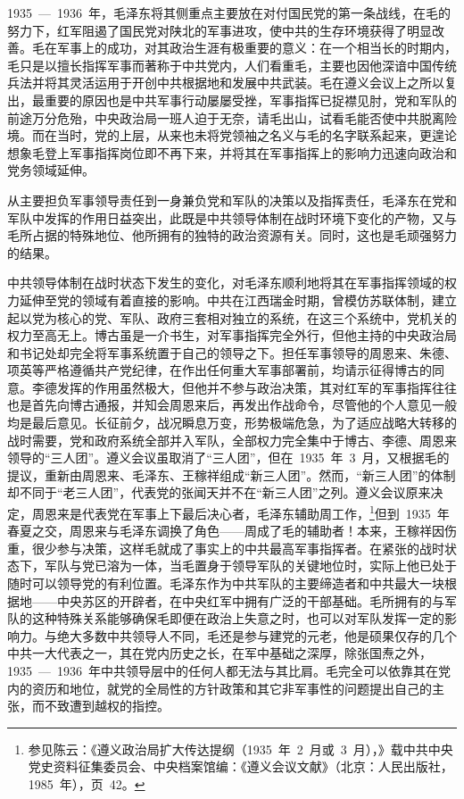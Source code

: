 1935~—~1936~年，毛泽东将其侧重点主要放在对付国民党的第一条战线，在毛的努力下，红军阻遏了国民党对陕北的军事进攻，使中共的生存环境获得了明显改善。毛在军事上的成功，对其政治生涯有极重要的意义：在一个相当长的时期内，毛只是以擅长指挥军事而著称于中共党内，人们看重毛，主要也因他深谙中国传统兵法并将其灵活运用于开创中共根据地和发展中共武装。毛在遵义会议上之所以复出，最重要的原因也是中共军事行动屡屡受挫，军事指挥已捉襟见肘，党和军队的前途万分危殆，中央政治局一班人迫于无奈，请毛出山，试看毛能否使中共脱离险境。而在当时，党的上层，从来也未将党领袖之名义与毛的名字联系起来，更遑论想象毛登上军事指挥岗位即不再下来，并将其在军事指挥上的影响力迅速向政治和党务领域延伸。

从主要担负军事领导责任到一身兼负党和军队的决策以及指挥责任，毛泽东在党和军队中发挥的作用日益突出，此既是中共领导体制在战时环境下变化的产物，又与毛所占据的特殊地位、他所拥有的独特的政治资源有关。同时，这也是毛顽强努力的结果。

中共领导体制在战时状态下发生的变化，对毛泽东顺利地将其在军事指挥领域的权力延伸至党的领域有着直接的影响。中共在江西瑞金时期，曾模仿苏联体制，建立起以党为核心的党、军队、政府三套相对独立的系统，在这三个系统中，党机关的权力至高无上。博古虽是一介书生，对军事指挥完全外行，但他主持的中央政治局和书记处却完全将军事系统置于自己的领导之下。担任军事领导的周恩来、朱德、项英等严格遵循共产党纪律，在作出任何重大军事部署前，均请示征得博古的同意。李德发挥的作用虽然极大，但他并不参与政治决策，其对红军的军事指挥往往也是首先向博古通报，并知会周恩来后，再发出作战命令，尽管他的个人意见一般均是最后意见。长征前夕，战况瞬息万变，形势极端危急，为了适应战略大转移的战时需要，党和政府系统全部并入军队，全部权力完全集中于博古、李德、周恩来领导的“三人团”。遵义会议虽取消了“三人团”，但在~1935~年~3~月，又根据毛的提议，重新由周恩来、毛泽东、王稼祥组成“新三人团”。然而，“新三人团”的体制却不同于“老三人团”，代表党的张闻天并不在“新三人团”之列。遵义会议原来决定，周恩来是代表党在军事上下最后决心者，毛泽东辅助周工作，\footnote{参见陈云：《遵义政治局扩大传达提纲（1935~年~2~月或~3~月），》载中共中央党史资料征集委员会、中央档案馆编：《遵义会议文献》（北京：人民出版社，1985~年），页~42。}但到~1935~年春夏之交，周恩来与毛泽东调换了角色——周成了毛的辅助者！本来，王稼祥因伤重，很少参与决策，这样毛就成了事实上的中共最高军事指挥者。在紧张的战时状态下，军队与党已溶为一体，当毛置身于领导军队的关键地位时，实际上他已处于随时可以领导党的有利位置。毛泽东作为中共军队的主要缔造者和中共最大一块根据地——中央苏区的开辟者，在中央红军中拥有广泛的干部基础。毛所拥有的与军队的这种特殊关系能够确保毛即便在政治上失意之时，也可以对军队发挥一定的影响力。与绝大多数中共领导人不同，毛还是参与建党的元老，他是硕果仅存的几个中共一大代表之一，其在党内历史之长，在军中基础之深厚，除张国焘之外，1935~—~1936~年中共领导层中的任何人都无法与其比肩。毛完全可以依靠其在党内的资历和地位，就党的全局性的方针政策和其它非军事性的问题提出自己的主张，而不致遭到越权的指控。

